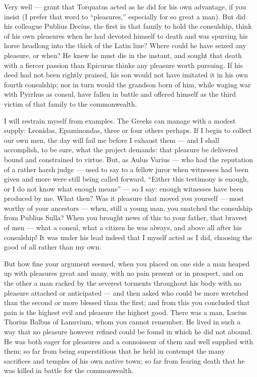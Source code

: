  Very well — grant that Torquatus acted as he did for his own advantage, if you insist (I prefer that word to ``pleasures,'' especially for so great a man). But did his colleague Publius Decius, the first in that family to hold the consulship, think of his own pleasures when he had devoted himself to death and was spurring his horse headlong into the thick of the Latin line? Where could he have seized any pleasure, or when? He knew he must die in the instant, and sought that death with a fiercer passion than Epicurus thinks any pleasure worth pursuing. If his deed had not been rightly praised, his son would not have imitated it in his own fourth consulship; nor in turn would the grandson born of him, while waging war with Pyrrhus as consul, have fallen in battle and offered himself as the third victim of that family to the commonwealth.

 I will restrain myself from examples. The Greeks can manage with a modest supply: Leonidas, Epaminondas, three or four others perhaps. If I begin to collect our own men, the day will fail me before I exhaust them — and I shall accomplish, to be sure, what the project demands: that pleasure be delivered bound and constrained to virtue. But, as Aulus Varius — who had the reputation of a rather harsh judge — used to say to a fellow juror when witnesses had been given and more were still being called forward, ``Either this testimony is enough, or I do not know what enough means'' — so I say: enough witnesses have been produced by me. What then? Was it pleasure that moved you yourself — most worthy of your ancestors — when, still a young man, you snatched the consulship from Publius Sulla? When you brought news of this to your father, that bravest of men — what a consul, what a citizen he was always, and above all after his consulship! It was under his lead indeed that I myself acted as I did, choosing the good of all rather than my own.

 But how fine your argument seemed, when you placed on one side a man heaped up with pleasures great and many, with no pain present or in prospect, and on the other a man racked by the severest torments throughout his body with no pleasure attached or anticipated — and then asked who could be more wretched than the second or more blessed than the first; and from this you concluded that pain is the highest evil and pleasure the highest good. There was a man, Lucius Thorius Balbus of Lanuvium, whom you cannot remember. He lived in such a way that no pleasure however refined could be found in which he did not abound. He was both eager for pleasures and a connoisseur of them and well supplied with them; so far from being superstitious that he held in contempt the many sacrifices and temples of his own native town; so far from fearing death that he was killed in battle for the commonwealth.

